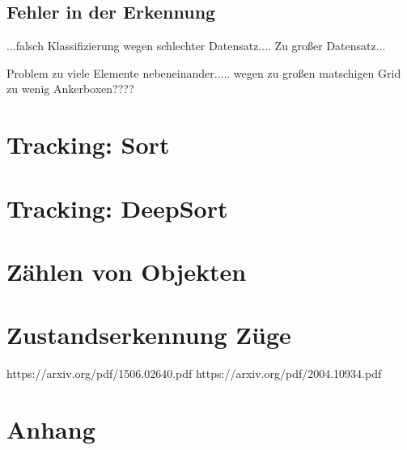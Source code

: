 \documentclass[conference]{IEEEtran}
\begin{document}
	\subsection{Fehler in der Erkennung}
	...falsch Klassifizierung wegen schlechter Datensatz....
	Zu großer Datensatz...
	
	Problem zu viele Elemente nebeneinander..... wegen zu großen matschigen Grid zu wenig Ankerboxen????

	\section{Tracking: Sort}
	
	\section{Tracking: DeepSort}
	
	\section{Zählen von Objekten}
	
	\section{Zustandserkennung Züge}
	
	\begin{thebibliography}{00}
		https://arxiv.org/pdf/1506.02640.pdf
		https://arxiv.org/pdf/2004.10934.pdf
	\end{thebibliography}
	
	
	
	\section{Anhang}
	
\end{document}

